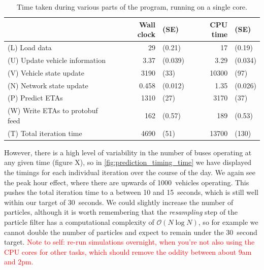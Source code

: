 \begin{knitrout}
\color{fgcolor}\begin{table}

\caption{\label{tab:prediction_timing}Time taken during various parts of the program, running on a single core.}
\centering
\begin{tabular}[t]{lrlrl}
\toprule
 & Wall clock & (SE) & CPU time & (SE)\\
\midrule
(L) Load data & 29 & (0.21) & 17 & (0.19)\\
(U) Update vehicle information & 3.37 & (0.039) & 3.29 & (0.034)\\
(V) Vehicle state update & 3190 & (33) & 10300 & (97)\\
(N) Network state update & 0.458 & (0.012) & 1.35 & (0.026)\\
(P) Predict ETAs & 1310 & (27) & 3170 & (37)\\
\addlinespace
(W) Write ETAs to protobuf feed & 162 & (0.57) & 189 & (0.53)\\
\midrule
(T) Total iteration time & 4690 & (51) & 13700 & (130)\\
\bottomrule
\end{tabular}
\end{table}


\end{knitrout}


However, there is a high level of variability in the number of buses operating at any given time (figure X), so in \cref{fig:prediction_timing_time} we have displayed the timings for each individual iteration over the course of the day. We again see the peak hour effect, where there are upwards of 1000~vehicles operating. This pushes the total iteration time to a between 10 and 15~seconds, which is still well within our target of 30~seconds. We could slightly increase the number of particles, although it is worth remembering that the \emph{resampling} step of the particle filter has a computational complexity of $\mathcal{O}(N\log N)$, so for example we cannot double the number of particles and expect to remain under the 30~second target.
\textcolor{red}{Note to self: re-run simulations overnight, when you're not also using the CPU cores for other tasks, which should remove the oddity between about 9am and 2pm.}


